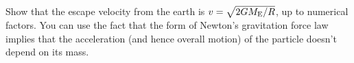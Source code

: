Show that the escape velocity from the earth is $v = \sqrt{2GM_{\rm E}/R}$, up to numerical factors. You can use the fact that the form of Newton's gravitation force law implies that the acceleration (and hence overall motion) of the particle doesn't depend on its mass.